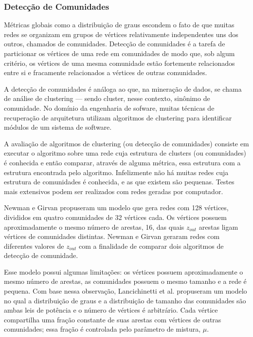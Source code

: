 \documentclass{article}
\begin{document}

\subsubsection{Detecção de Comunidades}

Métricas globais como a distribuição de graus escondem o fato de que muitas redes se organizam em grupos de vértices relativamente independentes uns dos outros, chamados de comunidades. Detecção de comunidades é a tarefa de particionar os vértices de uma rede em comunidades de modo que, sob algum critério, os vértices de uma mesma comunidade estão fortemente relacionados entre si e fracamente relacionados a vértices de outras comunidades.

A detecção de comunidades é análoga ao que, na mineração de dados, se chama de análise de clustering --- sendo cluster, nesse contexto, sinônimo de comunidade. No domínio da engenharia de sofware, muitas técnicas de recuperação de arquitetura utilizam algoritmos de clustering para identificar módulos de um sistema de software.

A avaliação de algoritmos de clustering (ou detecção de comunidades) consiste em executar o algoritmo sobre uma rede cuja estrutura de clusters (ou comunidades) é conhecida e então comparar, através de alguma métrica, essa estrutura com a estrutura encontrada pelo algoritmo. Infelizmente não há muitas redes cuja estrutura de comunidades é conhecida, e as que existem são pequenas. Testes mais extensivos podem ser realizados com redes geradas por computador.

Newman e Girvan \cite{Newman2004a} propuseram um modelo que gera redes com 128 vértices, divididos em quatro comunidades de 32 vértices cada. Os vértices possuem aproximadamente o mesmo número de arestas, 16, das quais $z_{out}$ arestas ligam vértices de comunidades distintas. Newman e Girvan geraram redes com diferentes valores de $z_{out}$ com a finalidade de comparar dois algoritmos de detecção de comunidade.

Esse modelo possui algumas limitações: os vértices possuem aproximadamente o mesmo número de arestas, as comunidades possuem o mesmo tamanho e a rede é pequena. Com base nessa observação, Lancichinetti et al. \cite{Lancichinetti2008} propuseram um modelo no qual a distribuição de graus e a distribuição de tamanho das comunidades são ambas leis de potência e o número de vértices é arbitrário. Cada vértice compartilha uma fração constante de suas arestas com vértices de outras comunidades; essa fração é controlada pelo parâmetro de mistura, $\mu$.
\end{document}
